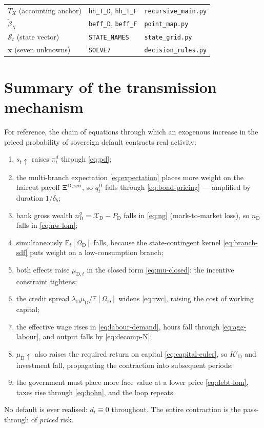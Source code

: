 \documentclass[11pt]{article}
\numberwithin{equation}{section}
\newcommand{\E}{\mathbb{E}}
\newcommand{\code}[1]{\texttt{\small #1}}
\newcommand{\D}{\mathrm{D}}
\theoremstyle{definition}
\theoremstyle{plain}
\theoremstyle{remark}
\begin{document}
\begin{table}[htbp]
\begin{tabular}{@{}l>{\raggedright\arraybackslash}p{5.3cm}l@{}}
$\bar T_X$ (accounting anchor)         & \code{hh\_T\_D}, \code{hh\_T\_F}        & \code{recursive\_main.py}\\
$\tilde\beta_X$                        & \code{beff\_D}, \code{beff\_F}          & \code{point\_map.py}\\
$\mathcal{S}_t$ (state vector)         & \code{STATE\_NAMES}                     & \code{state\_grid.py}\\
$\mathbf{x}$ (seven unknowns)          & \code{SOLVE7}                           & \code{decision\_rules.py}\\
\bottomrule
\end{tabular}
\end{table}

\section{Summary of the transmission mechanism}

For reference, the chain of equations through which an exogenous increase in the
priced probability of sovereign default contracts real activity:
\begin{enumerate}
\item $s_t\uparrow$ raises $\pi^{d}_t$ through \eqref{eq:pd};
\item the multi-branch expectation \eqref{eq:expectation} places more weight on the
      haircut payoff $\Xi^{\D,\rm ren}$, so $q^{\D}_t$ falls through
      \eqref{eq:bond-pricing} --- amplified by duration $1/\delta_b$;
\item bank gross wealth $n^{g}_{\D}=\mathcal{X}_\D-P_\D$ falls in \eqref{eq:ng}
      (mark-to-market loss), so $n_\D$ falls in \eqref{eq:nw-lom};
\item simultaneously $\E_t[\Omega_\D]$ falls, because the state-contingent kernel
      \eqref{eq:branch-sdf} puts weight on a low-consumption branch;
\item both effects raise $\mu_{\D,t}$ in the closed form \eqref{eq:mu-closed}: the
      incentive constraint tightens;
\item the credit spread $\lambda_\D\mu_\D/\E[\Omega_\D]$ widens \eqref{eq:rwc},
      raising the cost of working capital;
\item the effective wage rises in \eqref{eq:labour-demand}, hours fall through
      \eqref{eq:agg-labour}, and output falls by \eqref{eq:decomp-N};
\item $\mu_\D\uparrow$ also raises the required return on capital
      \eqref{eq:capital-euler}, so $K'_\D$ and investment fall, propagating the
      contraction into subsequent periods;
\item the government must place more face value at a lower price
      \eqref{eq:debt-lom}, taxes rise through \eqref{eq:bohn}, and the loop repeats.
\end{enumerate}
No default is ever realised: $d_t\equiv0$ throughout. The entire contraction is the
pass-through of \emph{priced} risk.
\end{document}
